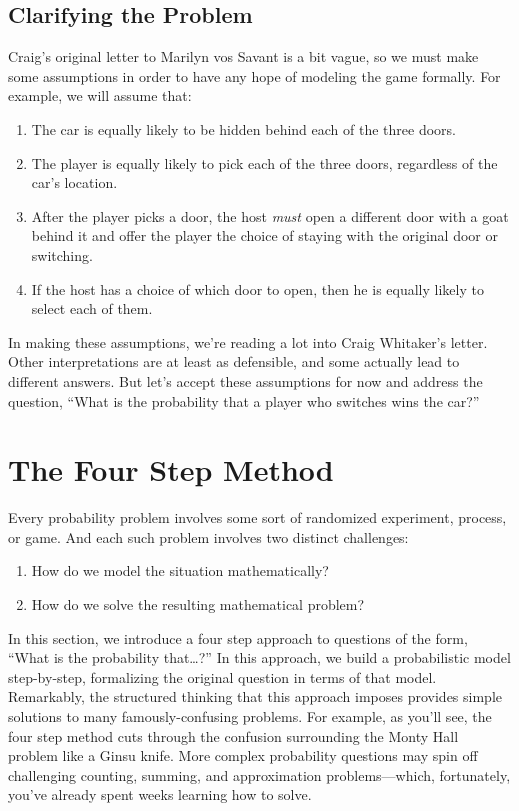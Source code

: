 \subsection{Clarifying the Problem}

Craig's original letter to Marilyn vos Savant is a bit vague, so we
must make some assumptions in order to have any hope of modeling the
game formally.  For example, we will assume that:
\begin{enumerate}

\item The car is equally likely to be hidden behind each of the three
doors.

\item The player is equally likely to pick each of the three doors,
regardless of the car's location.

\item After the player picks a door, the host \emph{must} open a
different door with a goat behind it and offer the player the choice
of staying with the original door or switching.

\item If the host has a choice of which door to open, then he is
equally likely to select each of them.

\end{enumerate}
%
In making these assumptions, we're reading a lot into Craig Whitaker's
letter.  Other interpretations are at least as defensible, and some
actually lead to different answers.  But let's accept these
assumptions for now and address the question, ``What is the
probability that a player who switches wins the car?''

\section{The Four Step Method}

Every probability problem involves some sort of randomized experiment,
process, or game.  And each such problem involves two distinct
challenges:
%
\begin{enumerate}
\item How do we model the situation mathematically?
\item How do we solve the resulting mathematical problem?
\end{enumerate}
%
In this section, we introduce a four step approach to questions of the
form, ``What is the probability that\dots?''  In this approach, we build
a probabilistic model step-by-step, formalizing the original question in
terms of that model.  Remarkably, the structured thinking that this
approach imposes provides simple solutions to many famously-confusing
problems.  For example, as you'll see, the four step method cuts through
the confusion surrounding the Monty Hall problem like a Ginsu knife.
More complex probability questions may spin off challenging
counting, summing, and approximation problems---which, fortunately,
you've already spent weeks learning how to solve.


